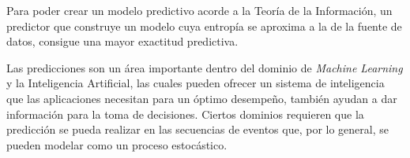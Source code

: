 








Para poder crear un modelo predictivo acorde a la Teoría de la Información, un predictor que construye un modelo cuya entropía se aproxima a la de la fuente de datos, consigue una mayor exactitud predictiva. 


Las predicciones son un área importante dentro del dominio de \emph{Machine Learning} y la Inteligencia Artificial, las cuales pueden ofrecer un sistema de inteligencia que las aplicaciones necesitan para un óptimo desempeño, también ayudan a dar información para la toma de decisiones. Ciertos dominios requieren que la predicción se pueda realizar en las secuencias de eventos que, por lo general, se pueden modelar como un proceso estocástico. 


